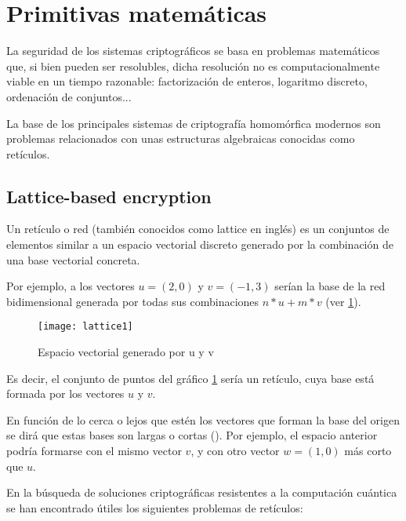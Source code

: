 \section{Primitivas matemáticas}

La seguridad de los sistemas criptográficos se basa en problemas matemáticos que, si bien pueden ser resolubles, dicha resolución no es computacionalmente viable en un tiempo razonable: factorización de enteros, logaritmo discreto, ordenación de conjuntos...

La base de los principales sistemas de criptografía homomórfica modernos son problemas relacionados con unas estructuras algebraicas conocidas como retículos.

\subsection{Lattice-based encryption}

Un retículo o red (también conocidos como lattice en inglés) es un conjuntos de elementos similar a un espacio vectorial discreto generado por la combinación de una base vectorial concreta.

Por ejemplo, a los vectores $u = (2, 0)$ y $v = (-1, 3)$ serían la base de la red bidimensional generada por todas sus combinaciones $n*u + m*v$ (ver \ref{fig:lattice1}).

\begin{figure}[h]
  \caption{Espacio vectorial generado por u y v}
  \label{fig:lattice1}
  \texttt{[image: lattice1]}
\end{figure}

Es decir, el conjunto de puntos del gráfico \ref{fig:lattice1} sería un retículo, cuya base está formada por los vectores $u$ y $v$.

En función de lo cerca o lejos que estén los vectores que forman la base del origen se dirá que estas bases son largas o cortas (\cite{wickr_what_2018}). Por ejemplo, el espacio anterior podría formarse con el mismo vector $v$, y con otro vector $w = (1, 0)$ más corto que $u$.

En la búsqueda de soluciones criptográficas resistentes a la computación cuántica se han encontrado útiles los siguientes problemas de retículos:

